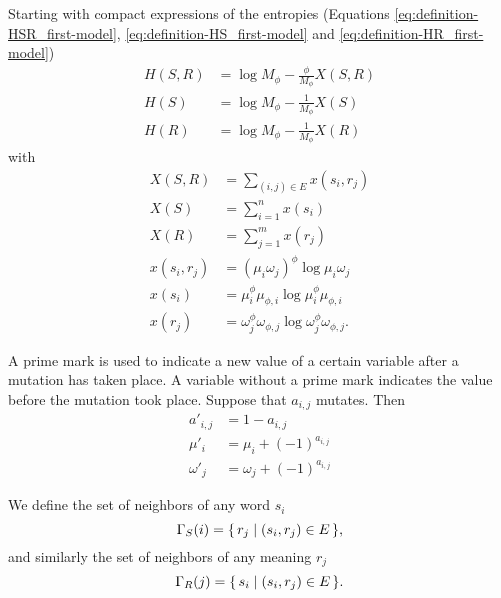 Starting with compact expressions of the entropies (Equations \eqref{eq:definition-HSR_first-model}, \eqref{eq:definition-HS_first-model} and \eqref{eq:definition-HR_first-model})
\begin{align}
  \label{eq:definition-HSR_first-model_compact}
  H(S,R) &= \log M_\phi - \frac{\phi}{M_\phi} X(S,R) \\
  \label{eq:definition-HS_first-model_compact}
  H(S) &= \log M_\phi - \frac{1}{M_\phi} X(S) \\
  \label{eq:definition-HR_first-model_compact}
  H(R) &= \log M_\phi - \frac{1}{M_\phi} X(R)
\end{align}
with
\begin{align}
  \label{eq:definition-XSR_first-model_dynamic}
  X(S,R) &= \sum_{(i,j) \in E} x(s_i, r_j) \\
  \label{eq:definition-XS_first-model_dynamic}
  X(S) &= \sum_{i=1}^n x(s_i) \\
  \label{eq:definition-XR_first-model_dynamic}
  X(R) &= \sum_{j=1}^m x(r_j) \\
  \label{eq:definition-Xsirj_first-model_dynamic}
  x(s_i, r_j) &= (\mu_i\omega_j)^\phi \log \mu_i\omega_j \\
  \label{eq:definition-Xsi_first-model_dynamic}
  x(s_i) &= \mu_i^\phi \mu_{\phi,i} \log \mu_i^\phi \mu_{\phi,i} \\
  \label{eq:definition-Xrj_first-model_dynamic}
  x(r_j) &= \omega_j^\phi \omega_{\phi,j} \log \omega_j^\phi \omega_{\phi,j}.
\end{align}

A prime mark is used to indicate a new value of a certain variable after a mutation has taken place.
A variable without a prime mark indicates the value before the mutation took place.
Suppose that $a_{i,j}$ mutates.
Then
\begin{align}
  \label{eq:definition-aij_dynamic}
  a'_{i,j} &= 1 - a_{i,j} \\
  \label{eq:definition-mui_dynamic}
  \mu'_i &= \mu_i + (-1)^{a_{i,j}} \\
  \label{eq:definition-wj_dynamic}
  \omega'_j &= \omega_j + (-1)^{a_{i,j}}
\end{align}

We define the set of neighbors of any word $s_i$
\begin{equation}
  \label{eq:definition-Gamma-S}
  \Gamma_S(i) = \{\,r_j\mid(s_i,r_j) \in E\,\},
\end{equation}
and similarly the set of neighbors of any meaning $r_j$
\begin{equation}
  \label{eq:definition-Gamma-R}
  \Gamma_R(j) = \{\,s_i\mid(s_i,r_j) \in E\,\}.
\end{equation}

